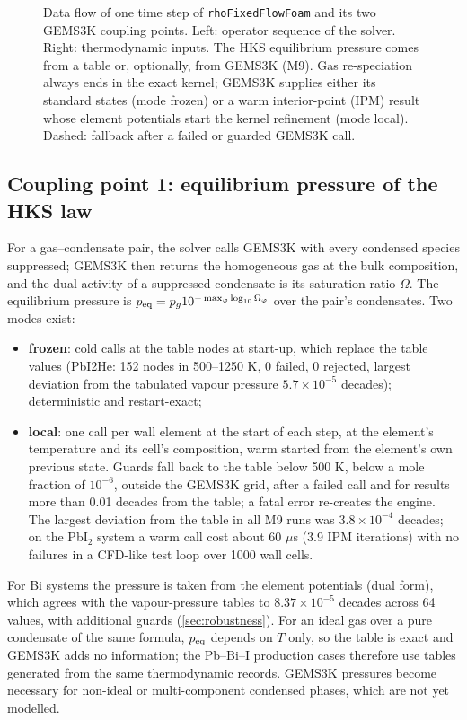 \documentclass[11pt,a4paper]{article}
\begin{document}
\begin{figure}[tbp]
\caption{Data flow of one time step of \texttt{rhoFixedFlowFoam} and its
two GEMS3K coupling points. Left: operator sequence of the solver.
Right: thermodynamic inputs. The HKS equilibrium pressure comes from a
table or, optionally, from GEMS3K (M9). Gas re-speciation always ends in
the exact kernel; GEMS3K supplies either its standard states (mode
frozen) or a warm interior-point (IPM) result whose element potentials
start the kernel refinement (mode local). Dashed: fallback after a
failed or guarded GEMS3K call.}
\label{fig:dataflow}
\end{figure}

\subsection{Coupling point 1: equilibrium pressure of the HKS law}
\label{sec:peq}

For a gas--condensate pair, the solver calls GEMS3K with every condensed
species suppressed; GEMS3K then returns the homogeneous gas at the bulk
composition, and the dual activity of a suppressed condensate is its
saturation ratio $\Omega$. The equilibrium pressure is
$p_{\rm eq}=p_g10^{-\max_\varphi\log_{10}\Omega_\varphi}$ over the
pair's condensates. Two modes exist:
\begin{itemize}
\item \textbf{frozen}: cold calls at the table nodes at start-up, which
  replace the table values (PbI2He: 152 nodes in 500--1250 K, 0 failed,
  0 rejected, largest deviation from the tabulated vapour pressure
  $5.7\times10^{-5}$ decades); deterministic and restart-exact;
\item \textbf{local}: one call per wall element at the start of each
  step, at the element's temperature and its cell's composition, warm
  started from the element's own previous state. Guards fall back to the
  table below 500 K, below a mole fraction of $10^{-6}$, outside the
  GEMS3K grid, after a failed call and for results more than 0.01 decades
  from the table; a fatal error re-creates the engine. The largest
  deviation from the table in all M9 runs was $3.8\times10^{-4}$ decades;
  on the PbI$_2$ system a warm call cost about 60 $\mu$s (3.9 IPM
  iterations) with no failures in a CFD-like test loop over 1000 wall
  cells.
\end{itemize}
For Bi systems the pressure is taken from the element potentials (dual
form), which agrees with the vapour-pressure tables to
$8.37\times10^{-5}$ decades across 64 values, with additional guards
(\cref{sec:robustness}). For an ideal gas over a pure condensate of the
same formula, $p_{\rm eq}$ depends on $T$ only, so the table is exact
and GEMS3K adds no information; the Pb--Bi--I production cases therefore
use tables generated from the same thermodynamic records. GEMS3K
pressures become necessary for non-ideal or multi-component condensed
phases, which are not yet modelled.
\end{document}
